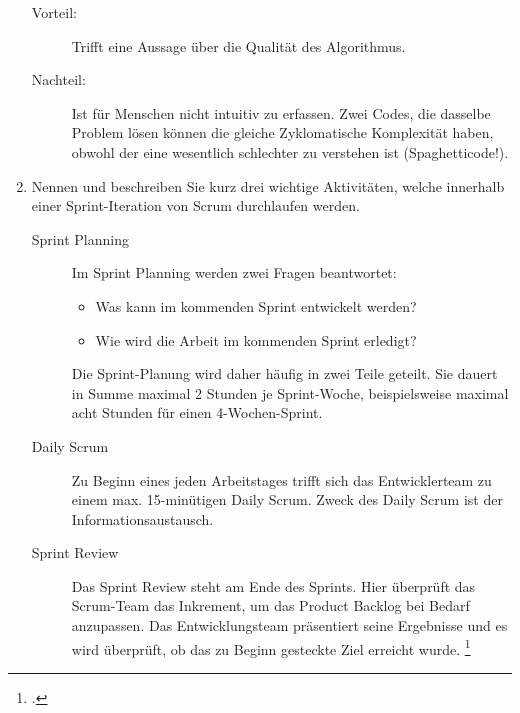 \documentclass{bschlangaul-aufgabe}
\begin{document}
\begin{enumerate}
\begin{bAntwort}
\begin{description}
\item[Vorteil:]

Trifft eine Aussage über die Qualität des Algorithmus.

\item[Nachteil:]

Ist für Menschen nicht intuitiv zu erfassen. Zwei Codes, die dasselbe
Problem lösen können die gleiche Zyklomatische Komplexität haben, obwohl
der eine wesentlich schlechter zu verstehen ist (Spaghetticode!).
\end{description}
\end{bAntwort}


\item Nennen und beschreiben Sie kurz drei wichtige Aktivitäten, welche
innerhalb einer Sprint-Iteration von Scrum durchlaufen werden.

\begin{bAntwort}
\begin{description}
\item[Sprint Planning]

Im Sprint Planning werden zwei Fragen beantwortet:

\begin{itemize}
\item Was kann im kommenden Sprint entwickelt werden?
\item Wie wird die Arbeit im kommenden Sprint erledigt?
\end{itemize}

Die Sprint-Planung wird daher häufig in zwei Teile geteilt. Sie dauert
in Summe maximal 2 Stunden je Sprint-Woche, beispielsweise maximal acht
Stunden für einen 4-Wochen-Sprint.

\item[Daily Scrum]

Zu Beginn eines jeden Arbeitstages trifft sich das Entwicklerteam zu
einem max. 15-minütigen Daily Scrum. Zweck des Daily Scrum ist der
Informationsaustausch.

\item[Sprint Review]

Das Sprint Review steht am Ende des Sprints. Hier überprüft das
Scrum-Team das Inkrement, um das Product Backlog bei Bedarf anzupassen.
Das Entwicklungsteam präsentiert seine Ergebnisse und es wird überprüft,
ob das zu Beginn gesteckte Ziel erreicht wurde.
\footcite{wiki:scrum}
\end{description}
\end{bAntwort}


\end{enumerate}
\end{document}
